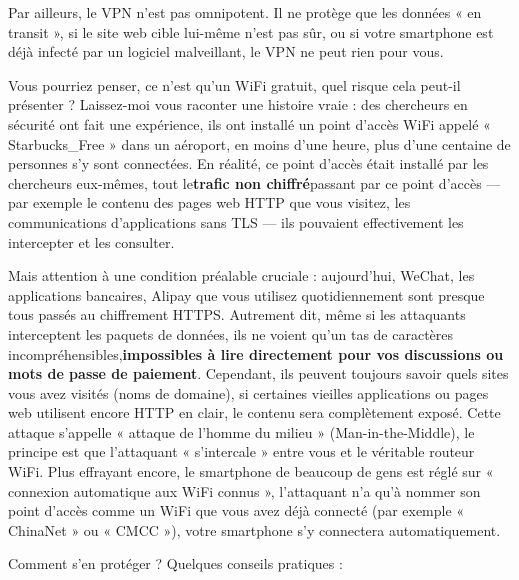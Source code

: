 Par ailleurs, le VPN n'est pas omnipotent. Il ne protège que les données « en transit », si le site web cible lui-même n'est pas sûr, ou si votre smartphone est déjà infecté par un logiciel malveillant, le VPN ne peut rien pour vous.


Vous pourriez penser, ce n'est qu'un WiFi gratuit, quel risque cela peut-il présenter ? Laissez-moi vous raconter une histoire vraie : des chercheurs en sécurité ont fait une expérience, ils ont installé un point d'accès WiFi appelé « Starbucks\_Free » dans un aéroport, en moins d'une heure, plus d'une centaine de personnes s'y sont connectées. En réalité, ce point d'accès était installé par les chercheurs eux-mêmes, tout le\textbf{trafic non chiffré}passant par ce point d'accès — par exemple le contenu des pages web HTTP que vous visitez, les communications d'applications sans TLS — ils pouvaient effectivement les intercepter et les consulter.

Mais attention à une condition préalable cruciale : aujourd'hui, WeChat, les applications bancaires, Alipay que vous utilisez quotidiennement sont presque tous passés au chiffrement HTTPS. Autrement dit, même si les attaquants interceptent les paquets de données, ils ne voient qu'un tas de caractères incompréhensibles,\textbf{impossibles à lire directement pour vos discussions ou mots de passe de paiement}. Cependant, ils peuvent toujours savoir quels sites vous avez visités (noms de domaine), si certaines vieilles applications ou pages web utilisent encore HTTP en clair, le contenu sera complètement exposé. Cette attaque s'appelle « attaque de l'homme du milieu » (Man-in-the-Middle), le principe est que l'attaquant « s'intercale » entre vous et le véritable routeur WiFi. Plus effrayant encore, le smartphone de beaucoup de gens est réglé sur « connexion automatique aux WiFi connus », l'attaquant n'a qu'à nommer son point d'accès comme un WiFi que vous avez déjà connecté (par exemple « ChinaNet » ou « CMCC »), votre smartphone s'y connectera automatiquement.

Comment s'en protéger ? Quelques conseils pratiques :

